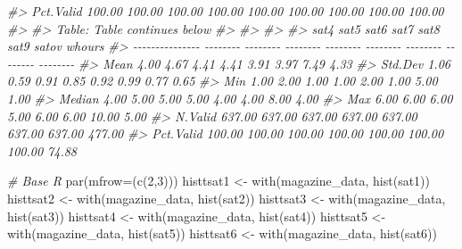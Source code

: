 \documentclass[
]{article}
\newenvironment{Shaded}{\begin{snugshade}}{\end{snugshade}}
\newcommand{\AttributeTok}[1]{\textcolor[rgb]{0.77,0.63,0.00}{#1}}
\newcommand{\CommentTok}[1]{\textcolor[rgb]{0.56,0.35,0.01}{\textit{#1}}}
\newcommand{\DecValTok}[1]{\textcolor[rgb]{0.00,0.00,0.81}{#1}}
\newcommand{\FunctionTok}[1]{\textcolor[rgb]{0.00,0.00,0.00}{#1}}
\newcommand{\NormalTok}[1]{#1}
\newcommand{\OtherTok}[1]{\textcolor[rgb]{0.56,0.35,0.01}{#1}}
\begin{document}
\begin{Shaded}
\begin{Highlighting}[]
\CommentTok{\#\textgreater{}       Pct.Valid   100.00   100.00   100.00    100.00   100.00   100.00   100.00   100.00   100.00}
\CommentTok{\#\textgreater{} }
\CommentTok{\#\textgreater{} Table: Table continues below}
\CommentTok{\#\textgreater{} }
\CommentTok{\#\textgreater{}  }
\CommentTok{\#\textgreater{} }
\CommentTok{\#\textgreater{}                     sat4     sat5     sat6     sat7     sat8     sat9    satov   whours}
\CommentTok{\#\textgreater{} {-}{-}{-}{-}{-}{-}{-}{-}{-}{-}{-}{-}{-}{-}{-} {-}{-}{-}{-}{-}{-}{-}{-} {-}{-}{-}{-}{-}{-}{-}{-} {-}{-}{-}{-}{-}{-}{-}{-} {-}{-}{-}{-}{-}{-}{-}{-} {-}{-}{-}{-}{-}{-}{-}{-} {-}{-}{-}{-}{-}{-}{-}{-} {-}{-}{-}{-}{-}{-}{-}{-} {-}{-}{-}{-}{-}{-}{-}{-}}
\CommentTok{\#\textgreater{}            Mean     4.00     4.67     4.41     4.41     3.91     3.97     7.49     4.33}
\CommentTok{\#\textgreater{}         Std.Dev     1.06     0.59     0.91     0.85     0.92     0.99     0.77     0.65}
\CommentTok{\#\textgreater{}             Min     1.00     2.00     1.00     1.00     2.00     1.00     5.00     1.00}
\CommentTok{\#\textgreater{}          Median     4.00     5.00     5.00     5.00     4.00     4.00     8.00     4.00}
\CommentTok{\#\textgreater{}             Max     6.00     6.00     6.00     5.00     6.00     6.00    10.00     5.00}
\CommentTok{\#\textgreater{}         N.Valid   637.00   637.00   637.00   637.00   637.00   637.00   637.00   477.00}
\CommentTok{\#\textgreater{}       Pct.Valid   100.00   100.00   100.00   100.00   100.00   100.00   100.00    74.88}
\end{Highlighting}
\end{Shaded}

\begin{Shaded}
\begin{Highlighting}[]
\CommentTok{\# Base R}
\FunctionTok{par}\NormalTok{(}\AttributeTok{mfrow=}\NormalTok{(}\FunctionTok{c}\NormalTok{(}\DecValTok{2}\NormalTok{,}\DecValTok{3}\NormalTok{)))}
\NormalTok{histtsat1 }\OtherTok{\textless{}{-}} \FunctionTok{with}\NormalTok{(magazine\_data, }\FunctionTok{hist}\NormalTok{(sat1))}
\NormalTok{histtsat2 }\OtherTok{\textless{}{-}} \FunctionTok{with}\NormalTok{(magazine\_data, }\FunctionTok{hist}\NormalTok{(sat2))}
\NormalTok{histtsat3 }\OtherTok{\textless{}{-}} \FunctionTok{with}\NormalTok{(magazine\_data, }\FunctionTok{hist}\NormalTok{(sat3))}
\NormalTok{histtsat4 }\OtherTok{\textless{}{-}} \FunctionTok{with}\NormalTok{(magazine\_data, }\FunctionTok{hist}\NormalTok{(sat4))}
\NormalTok{histtsat5 }\OtherTok{\textless{}{-}} \FunctionTok{with}\NormalTok{(magazine\_data, }\FunctionTok{hist}\NormalTok{(sat5))}
\NormalTok{histtsat6 }\OtherTok{\textless{}{-}} \FunctionTok{with}\NormalTok{(magazine\_data, }\FunctionTok{hist}\NormalTok{(sat6))}
\end{Highlighting}
\end{Shaded}
\end{document}
